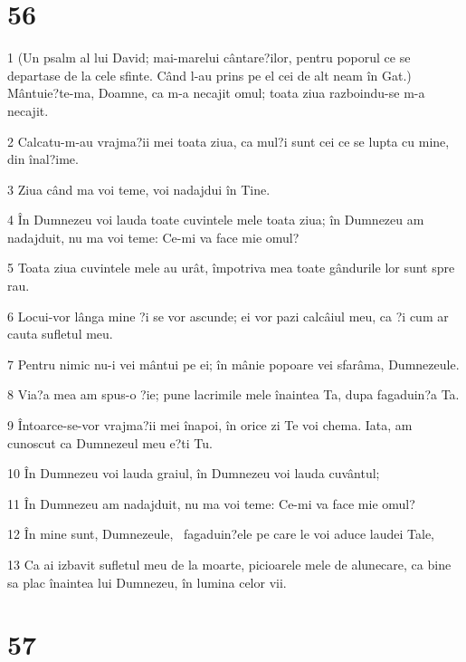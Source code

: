 \chapter{56}

\par 1 (Un psalm al lui David; mai-marelui cântare?ilor, pentru poporul ce se departase de la cele sfinte. Când l-au prins pe el cei de alt neam în Gat.) Mântuie?te-ma, Doamne, ca m-a necajit omul; toata ziua razboindu-se m-a necajit.
\par 2 Calcatu-m-au vrajma?ii mei toata ziua, ca mul?i sunt cei ce se lupta cu mine, din înal?ime.
\par 3 Ziua când ma voi teme, voi nadajdui în Tine.
\par 4 În Dumnezeu voi lauda toate cuvintele mele toata ziua; în Dumnezeu am nadajduit, nu ma voi teme: Ce-mi va face mie omul?
\par 5 Toata ziua cuvintele mele au urât, împotriva mea toate gândurile lor sunt spre rau.
\par 6 Locui-vor lânga mine ?i se vor ascunde; ei vor pazi calcâiul meu, ca ?i cum ar cauta sufletul meu.
\par 7 Pentru nimic nu-i vei mântui pe ei; în mânie popoare vei sfarâma, Dumnezeule.
\par 8 Via?a mea am spus-o ?ie; pune lacrimile mele înaintea Ta, dupa fagaduin?a Ta.
\par 9 Întoarce-se-vor vrajma?ii mei înapoi, în orice zi Te voi chema. Iata, am cunoscut ca Dumnezeul meu e?ti Tu.
\par 10 În Dumnezeu voi lauda graiul, în Dumnezeu voi lauda cuvântul;
\par 11 În Dumnezeu am nadajduit, nu ma voi teme: Ce-mi va face mie omul?
\par 12 În mine sunt, Dumnezeule,  fagaduin?ele pe care le voi aduce laudei Tale,
\par 13 Ca ai izbavit sufletul meu de la moarte, picioarele mele de alunecare, ca bine sa plac înaintea lui Dumnezeu, în lumina celor vii.

\chapter{57}

